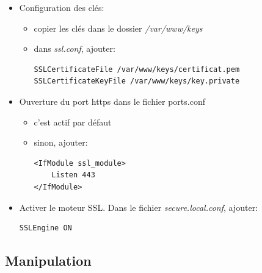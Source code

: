 \documentclass[a4paper]{article}
\begin{document}
\begin{itemize}
\item Configuration des clés:
\begin{itemize}
    \item copier les clés dans le dossier \textit{/var/www/keys}
    \item dans \textit{ssl.conf}, ajouter:
    \begin{verbatim}
SSLCertificateFile /var/www/keys/certificat.pem
SSLCertificateKeyFile /var/www/keys/key.private
    \end{verbatim}
\end{itemize}

\item Ouverture du port https dans le fichier ports.conf
\begin{itemize}
    \item c’est actif par défaut
    \item sinon, ajouter:
    \begin{verbatim}
<IfModule ssl_module>
    Listen 443
</IfModule>
    \end{verbatim}
\end{itemize}

\item Activer le moteur SSL. Dans le fichier \textit{secure.local.conf}, ajouter:
\begin{verbatim}
SSLEngine ON
\end{verbatim}

\end{itemize}










\subsection{Manipulation}
\end{document}
